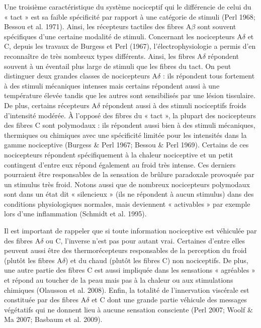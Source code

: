 \documentclass[a4paper,12pt,twoside]{report}
\begin{document}
\medskip 

Une troisième caractéristique du système nociceptif qui le différencie de celui du « tact » est sa faible spécificité par rapport à une catégorie de stimuli (Perl 1968; Bessou et al. 1971). Ainsi, les récepteurs tactiles des fibres A$\beta$ sont souvent spécifiques d’une certaine modalité de stimuli. Concernant les nocicepteurs A$\delta$ et C, depuis les travaux de Burgess et Perl (1967), l’électrophysiologie a permis d’en reconnaître de très nombreux types différents. Ainsi, les fibres A$\delta$ répondent souvent à un éventail plus large de stimuli que les fibres du tact. On peut distinguer deux grandes classes de nocicepteurs A$\delta$ : ils répondent tous fortement à des stimuli mécaniques intenses mais certains répondent aussi à une température élevée tandis que les autres sont sensibilisés par une lésion tissulaire. De plus, certains récepteurs A$\delta$ répondent aussi à des stimuli nociceptifs froids d'intensité modérée. À l’opposé des fibres du « tact », la plupart des nocicepteurs des fibres C sont polymodaux : ils répondent aussi bien à des stimuli mécaniques, thermiques ou chimiques avec une spécificité limitée pour les intensités dans la gamme nociceptive (Burgess \& Perl 1967; Bessou \& Perl 1969). Certains de ces nocicepteurs répondent spécifiquement à la chaleur nociceptive et un petit contingent d’entre eux répond également au froid très intense. Ces derniers pourraient être responsables de la sensation de brûlure paradoxale provoquée par un stimulus très froid. Notons aussi que de nombreux nocicepteurs polymodaux sont dans un état dit « silencieux » (ils ne répondent à aucun stimulus) dans des conditions physiologiques normales, mais deviennent « activables » par exemple lors d'une inflammation (Schmidt et al. 1995). 

\bigskip 

Il est important de rappeler que si toute information nociceptive est véhiculée par des fibres A$\delta$ ou C, l’inverse n’est pas pour autant vrai. Certaines d’entre elles peuvent aussi être des thermorécepteurs responsables de la perception du froid (plutôt les fibres A$\delta$) et du chaud (plutôt les fibres C) non nociceptifs. De plus, une autre partie des fibres C est aussi impliquée dans les sensations « agréables » et répond au toucher de la peau mais pas à la chaleur ou aux stimulations chimiques (Olausson et al. 2008). Enfin, la totalité de l'innervation viscérale est constituée par des fibres A$\delta$ et C dont une grande partie véhicule des messages végétatifs qui ne donnent lieu à aucune sensation consciente (Perl 2007; Woolf \& Ma 2007; Basbaum et al. 2009).
\end{document}
